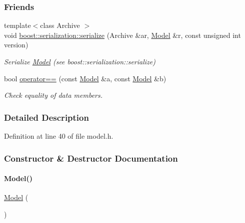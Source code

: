 \subsubsection*{Friends}
\begin{DoxyCompactItemize}
\item 
{\footnotesize template$<$class Archive $>$ }\\void \mbox{\hyperlink{classamici_1_1_model_aa81e8ed665213b21092fb9c3fcab18b2}{boost\+::serialization\+::serialize}} (Archive \&ar, \mbox{\hyperlink{classamici_1_1_model}{Model}} \&r, const unsigned int version)
\begin{DoxyCompactList}\small\item\em Serialize \mbox{\hyperlink{classamici_1_1_model}{Model}} (see boost\+::serialization\+::serialize) \end{DoxyCompactList}\item 
bool \mbox{\hyperlink{classamici_1_1_model_ad5a9ae5abc63d6c24c64506c0f9aed6d}{operator==}} (const \mbox{\hyperlink{classamici_1_1_model}{Model}} \&a, const \mbox{\hyperlink{classamici_1_1_model}{Model}} \&b)
\begin{DoxyCompactList}\small\item\em Check equality of data members. \end{DoxyCompactList}\end{DoxyCompactItemize}


\subsubsection{Detailed Description}


Definition at line 40 of file model.\+h.



\subsubsection{Constructor \& Destructor Documentation}
\mbox{\label{classamici_1_1_model_a30c57abda5ed227c85b50007cee876db}} 
\paragraph{\texorpdfstring{Model()}{Model()}\hspace{0.1cm}{\footnotesize\ttfamily [1/3]}}
{\footnotesize\ttfamily \mbox{\hyperlink{classamici_1_1_model}{Model}} (\begin{DoxyParamCaption}{ }\end{DoxyParamCaption})}

